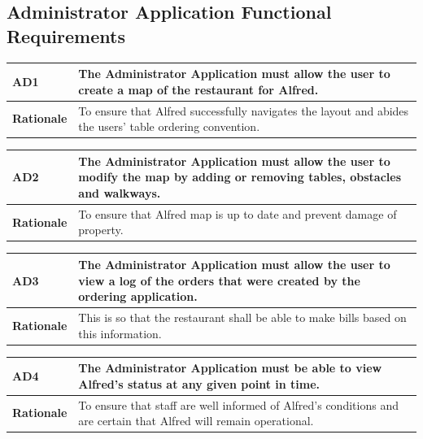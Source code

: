 \documentclass [11pt]{article}
\begin{document}
\subsection{Administrator Application Functional Requirements}

\begin{longtable}{| p{ } | p{ } | }\hline 
\rowcolor{tableCell}\textbf{AD1} & The Administrator Application must allow the user to create a map of the restaurant for Alfred. \\ \hline
\textbf{Rationale} &  To ensure that Alfred successfully navigates the layout and abides the users' table ordering convention.\\ \hline 
\end{longtable}

\begin{longtable}{| p{ } | p{ } | }\hline 
\rowcolor{tableCell}\textbf{AD2} & The Administrator Application must allow the user to modify the map by adding or removing tables, obstacles and walkways.\\ \hline
\textbf{Rationale} &  To ensure that Alfred map is up to date and prevent damage of property.\\ \hline 
\end{longtable}

\begin{longtable}{| p{ } | p{ } | }\hline 
\rowcolor{tableCell}\textbf{AD3} & The Administrator Application must allow the user to view a log of the orders that were created by the ordering application. \\ \hline
\textbf{Rationale} &  This is so that the restaurant shall be able to make bills based on this information.\\ \hline 
\end{longtable}

\begin{longtable}{| p{ } | p{ } | }\hline 
\rowcolor{tableCell}\textbf{AD4} & The Administrator Application must be able to view Alfred's status at any given point in time. \\ \hline
\textbf{Rationale} &  To ensure that staff are well informed of Alfred's conditions and are certain that Alfred will remain operational. \\ \hline
\end{longtable}
\end{document}
